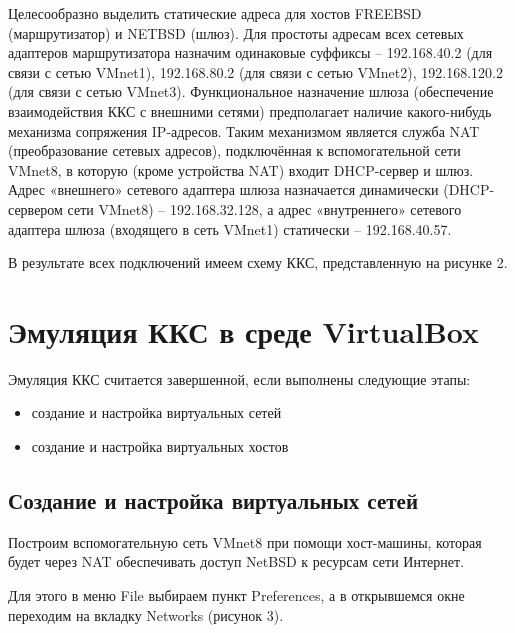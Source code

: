 \documentclass[a4paper, 12pt]{article}		%
\begin{document}
Целесообразно выделить статические адреса для хостов FREEBSD (маршрутизатор) и NETBSD (шлюз). Для простоты адресам всех сетевых адаптеров маршрутизатора назначим одинаковые суффиксы – 192.168.40.2 (для связи с сетью VMnet1), 192.168.80.2 (для связи с сетью VMnet2), 192.168.120.2 (для связи с сетью VMnet3). Функциональное назначение шлюза (обеспечение взаимодействия ККС с внешними сетями) предполагает наличие какого-нибудь механизма сопряжения IP-адресов. Таким механизмом является служба NAT (преобразование сетевых адресов), подключённая к вспомогательной сети VMnet8, в которую (кроме устройства NAT) входит DHCP-сервер и шлюз. Адрес «внешнего» сетевого адаптера шлюза назначается динамически (DHCP-сервером сети VMnet8) – 192.168.32.128, а  адрес «внутреннего» сетевого адаптера шлюза (входящего в сеть VMnet1) статически – 192.168.40.57.

В результате всех подключений имеем схему ККС, представленную на рисунке 2.

\newpage
\section{Эмуляция ККС в среде VirtualBox}

Эмуляция ККС считается завершенной, если выполнены следующие этапы:
\begin{itemize}
\item создание и настройка виртуальных сетей
\item создание и настройка виртуальных хостов
\end{itemize}

\subsection{Создание и настройка виртуальных сетей}

Построим вспомогательную сеть VMnet8 при помощи хост-машины, которая будет через NAT обеспечивать доступ NetBSD к ресурсам сети Интернет.

Для этого в меню File выбираем пункт Preferences, а в открывшемся окне переходим на вкладку Networks (рисунок 3).
\end{document}
